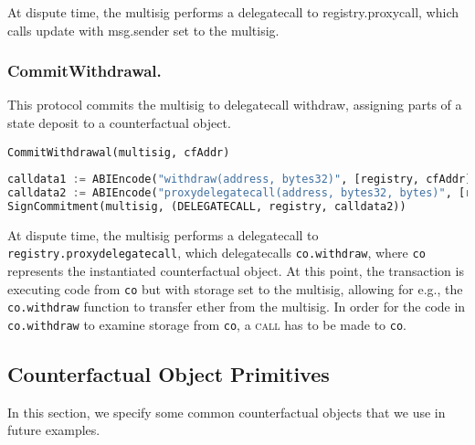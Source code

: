 \documentclass[prb,floatfix,reprint,nofootinbib,amsmath,amssymb,epsfig,pre,floats,letterpaper,groupedaffiliation,tightenlines,allcolors=blue,11pt]{revtex4}
\theoremstyle{definition}
\theoremstyle{definition}
\theoremstyle{definition}
\begin{document}
At dispute time, the multisig performs a delegatecall to registry.proxycall, which calls update with msg.sender set to the multisig.

\begin{figure}[H]
    \centering
    
\end{figure}

\subsubsection{CommitWithdrawal.} This protocol commits the multisig to delegatecall withdraw, assigning parts of a state deposit to a counterfactual object.

\vspace{1.5em}
\begin{protocol}{\texttt{CommitWithdrawal(multisig, cfAddr)}}
\begin{lstlisting}[language=Python]
calldata1 := ABIEncode("withdraw(address, bytes32)", [registry, cfAddr])
calldata2 := ABIEncode("proxydelegatecall(address, bytes32, bytes)", [registry, cfAddr, calldata1])
SignCommitment(multisig, (DELEGATECALL, registry, calldata2))
\end{lstlisting}
\end{protocol}
\vspace{1.5em}

At dispute time, the multisig performs a delegatecall to \texttt{registry.proxydelegatecall}, which delegatecalls \texttt{co.withdraw}, where \texttt{co} represents the instantiated counterfactual object. At this point, the transaction is executing code from \texttt{co} but with storage set to the multisig, allowing for e.g., the \texttt{co.withdraw} function to transfer ether from the multisig. In order for the code in \texttt{co.withdraw} to examine storage from \texttt{co}, a \textsc{call} has to be made to \texttt{co}.

\begin{figure}[H]
    \centering
    
\end{figure}

\subsection{Counterfactual Object Primitives}

In this section, we specify some common counterfactual objects that we use in future examples.
\end{document}
